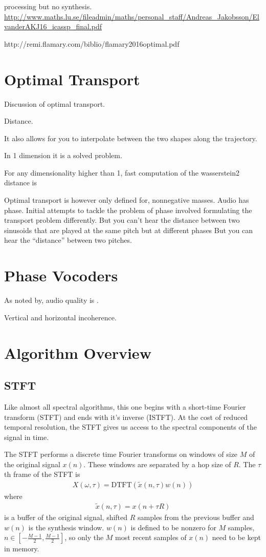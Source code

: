 \documentclass[12pt]{article}
\begin{document}
processing but no synthesis.
\url{http://www.maths.lu.se/fileadmin/maths/personal_staff/Andreas_Jakobsson/ElvanderAKJ16_icassp_final.pdf}

http://remi.flamary.com/biblio/flamary2016optimal.pdf

\section{Optimal Transport}

Discussion of optimal transport.

Distance. 

It also allows for you to interpolate between the two shapes along the trajectory.

In 1 dimension it is a solved problem.

For any dimensionality higher than 1, fast computation of the wasserstein2 distance is 

Optimal transport is however only defined for, nonnegative masses.
Audio has phase.
Initial attempts to tackle the problem of phase involved formulating the transport problem differently.
But you can't hear the distance between two sinusoids that are played at the same pitch but at different phases
But you can hear the ``distance'' between two pitches.

\section{Phase Vocoders}
As noted by, 
audio quality is .

Vertical and horizontal incoherence.


\section{Algorithm Overview}

\subsection{STFT}

Like almost all spectral algorithms, this one begins with a short-time Fourier transform (STFT) and ends with it's inverse (ISTFT).
At the cost of reduced temporal resolution, the STFT gives us access to the spectral components of the signal in time.

The STFT performs a discrete time Fourier transforms on windows of size $M$ of the original signal $x(n)$.
These windows are separated by a hop size of $R$. The $\tau$th frame of the STFT is
\begin{align}
  X(\omega, \tau) = 
  \text{DTFT}(\tilde{x}(n, \tau)w(n))
\end{align}
where
\begin{align}
  \tilde{x}(n,\tau) = x(n + \tau R)
\end{align}
is a buffer of the original signal, shifted $R$ samples from the previous buffer and $w(n)$ is the synthesis window.
$w(n)$ is defined to be nonzero for $M$ samples, 
$n\in\left[-\frac{M - 1}{2}, \frac{M - 1}{2}\right]$, so only the $M$ most recent samples of $x(n)$ need to be kept in memory.
\end{document}
